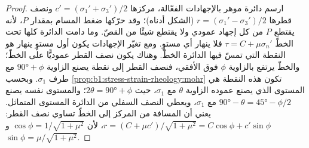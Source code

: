 \begin{proof}
ارسم دائرة موهر بالإجهادات الفعّالة، مركزها $c' =
(\sigma_1'+\sigma_3')/2$ ونصف قطرها $r = (\sigma_1'-\sigma_3')/2$ (الشكل أدناه)؛ وقد حرّكها ضغط المسام بمقدار $P$، لأنه يقتطع $P$ من كل إجهاد عمودي ولا يقتطع شيئًا من القصّ. وما دامت الدائرة كلها تحت الخطّ $\tau = C + \mu\sigma_n'$ فلا ينهار أي مستوٍ. ومع تغيّر الإجهادات يكون أول مستوٍ ينهار هو النقطة التي تمسّ فيها الدائرة الخطّ. وهناك يكون نصف القطر عموديًّا على الخطّ؛ والخطّ يرتفع بالزاوية $\phi$ فوق الأفقي، فنصف القطر إلى نقطة  يصنع الزاوية $\ang{90} + \phi$ مع طرف $\sigma_1$. وبحسب \cref{prop:b1:stress-strain-rheology:mohr} تكون هذه النقطة هي المستوى الذي يصنع عموده الزاوية $\theta$ مع $\sigma_1$، حيث $2\theta = \ang{90} + \phi$؛ والمستوى نفسه يصنع $\ang{90} - \theta = \ang{45} - \phi/2$ مع $\sigma_1$، ويعطي النصف السفلي من الدائرة المستوى المتماثل.  يعني أن المسافة من المركز إلى الخطّ تساوي نصف القطر:
$r = (C + \mu c')/\sqrt{1+\mu^2} = C\cos\phi + c'\sin\phi$، لأن
$\cos\phi = 1/\sqrt{1+\mu^2}$ و$\sin\phi = \mu/\sqrt{1+\mu^2}$.
\end{proof}

